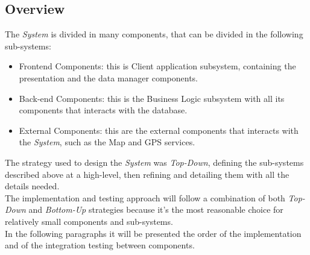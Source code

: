 \documentclass{article}
\begin{document}
	\subsection{Overview}
	The {\it System} is divided in many components, that can be divided in the following sub-systems:
	\begin{itemize}
		\item Frontend Components: this is Client application subsystem, containing the presentation and the data manager components.
		\item Back-end Components: this is the Business Logic subsystem with all its components that interacts with the database. 
		\item External Components: this are the external components that interacts with the {\it System}, such as the Map and GPS services.  
	\end{itemize}
	The strategy used to design the {\it System} was {\it Top-Down}, defining the sub-systems described above at a high-level, then refining and detailing them with all the details needed.\\
	The implementation and testing approach will follow a combination of both {\it Top-Down} and {\it Bottom-Up} strategies because it's the most reasonable choice for relatively small components and sub-systems. \\ 
	In the following paragraphs it will be presented the order of the implementation and of the integration testing between components.
		
\end{document}
